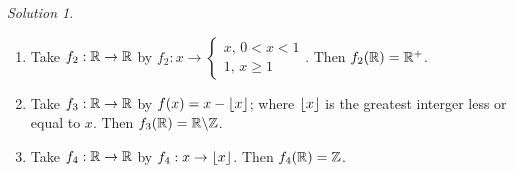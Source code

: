 \documentclass[12pt]{book}
\newcommand{\com}[2]{#1\backslash#2}
\DeclarePairedDelimiter\floor{\lfloor}{\rfloor}
\theoremstyle{plain}
\theoremstyle{plain} %
\theoremstyle{definition}
\theoremstyle{remark}
\newtheorem*{solution}{Solution}
\begin{document}
\begin{enumerate}
\begin{solution}
\begin{enumerate}[label=(\arabic*)]
                    \item Take $ f_2:\mathbb{R} \rightarrow \mathbb{R}$ by $f_2:x \rightarrow \begin{cases}
                                                    x \text{, } 0 < x < 1 \\
                                                    1 \text{, } x \geq 1
                                              \end{cases}$.
                        Then $ f_2(\mathbb{R})=\mathbb{R}^+$.

                    \item Take $ f_3:\mathbb{R} \rightarrow \mathbb{R}$ by $f(x)=x-\floor{x}$; where $\floor{x}$ is the
                      greatest interger less or equal to $x$. Then  $ f_3(\R)=\com{\R}{\Z}$.

                    \item Take $ f_4:\mathbb{R} \rightarrow \mathbb{R}$ by $ f_4:x \rightarrow \floor{x}$. Then $ f_4(\mathbb{R})=\mathbb{Z}$.
                \end{enumerate}
            \end{solution}

\end{enumerate}
\end{document}
